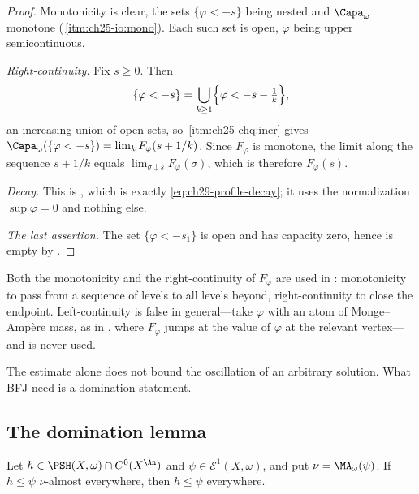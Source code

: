 \begin{proof}
Monotonicity is clear, the sets \(\{\varphi<-s\}\) being nested and
\(\Capa_\omega\) monotone
(\,\cref{itm:ch25-io:mono}).  Each such set is
open, \(\varphi\) being upper semicontinuous.

\emph{Right-continuity.}  Fix \(s\geq0\).  Then
\[
 \{\varphi<-s\}=\bigcup_{k\geq1}\Bigl\{\varphi<-s-\tfrac1k\Bigr\},
\]
an increasing union of open sets, so
\,\cref{itm:ch25-chq:incr} gives
\(\Capa_\omega(\{\varphi<-s\})=\lim_kF_\varphi(s+1/k)\).  Since
\(F_\varphi\) is monotone, the limit along the sequence \(s+1/k\) equals
\(\lim_{\sigma\downarrow s}F_\varphi(\sigma)\), which is therefore
\(F_\varphi(s)\).

\emph{Decay.}  This is , which is exactly
\eqref{eq:ch29-profile-decay}; it uses the normalization
\(\sup\varphi=0\) and nothing else.

\emph{The last assertion.}  The set \(\{\varphi<-s_1\}\) is open and has
capacity zero, hence is empty by
.
\end{proof}

\begin{remark}
\label{rem:ch29-right-continuity}
Both the monotonicity and the right-continuity of \(F_\varphi\) are used in
: monotonicity to pass from a sequence of levels to
all levels beyond, right-continuity to close the endpoint.  Left-continuity
is false in general---take \(\varphi\) with an atom of Monge--Amp\`ere mass,
as in , where \(F_\varphi\) jumps at
the value of \(\varphi\) at the relevant vertex---and is never used.
\end{remark}

The estimate alone does not bound the oscillation of an arbitrary solution.
What BFJ need is a domination statement.

\subsection{The domination lemma}
\label{sec:ch29-domination}

\begin{lemma}\label{lem:bfj-supported-domination}
Let \(h\in\PSH(X,\omega)\cap C^0(X^{\An})\) and
\(\psi\in\mathcal E^1(X,\omega)\), and put
\(\nu=\MA_\omega(\psi)\).
If \(h\leq\psi\) \(\nu\)-almost everywhere, then \(h\leq\psi\) everywhere.
\end{lemma}

